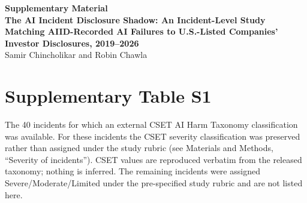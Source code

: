 \documentclass[11pt]{article}
\begin{document}
\begin{center}
{\large\bfseries Supplementary Material}\\[2pt]
\textbf{The AI Incident Disclosure Shadow: An Incident-Level Study Matching
AIID-Recorded AI Failures to U.S.-Listed Companies' Investor Disclosures,
2019--2026}\\[4pt]
Samir Chincholikar and Robin Chawla
\end{center}

\vspace{6pt}

\section*{Supplementary Table S1}

The 40 incidents for which an external CSET AI Harm Taxonomy classification was
available. For these incidents the CSET severity classification was preserved
rather than assigned under the study rubric (see Materials and Methods,
``Severity of incidents''). CSET values are reproduced verbatim from the
released taxonomy; nothing is inferred. The remaining incidents were assigned
Severe/Moderate/Limited under the pre-specified study rubric and are not listed
here.

\vspace{6pt}
\end{document}
